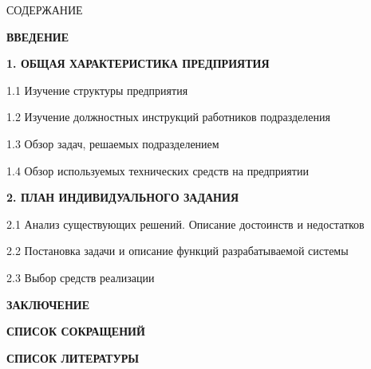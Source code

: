 {\gostTitleFont
    \redline
    СОДЕРЖАНИЕ
} 

\titlespace

{\gostFont
    \par
    \par {\bfseries ВВЕДЕНИЕ }
    \par {\bfseries 1. ОБЩАЯ ХАРАКТЕРИСТИКА ПРЕДПРИЯТИЯ }
    \par 1.1 Изучение структуры предприятия 
    \par 1.2 Изучение должностных инструкций работников подразделения 
    \par 1.3 Обзор задач, решаемых подразделением 
    \par 1.4 Обзор используемых технических средств на предприятии 
    \par {\bfseries 2. ПЛАН ИНДИВИДУАЛЬНОГО ЗАДАНИЯ }
    \par 2.1 Анализ существующих решений. Описание достоинств и недостатков 
    \par 2.2 Постановка задачи и описание функций разрабатываемой системы  
    \par 2.3 Выбор средств реализации  
    \par {\bfseries ЗАКЛЮЧЕНИЕ } 
    \par {\bfseries СПИСОК СОКРАЩЕНИЙ } 
    \par {\bfseries СПИСОК ЛИТЕРАТУРЫ } 
    \par 
}